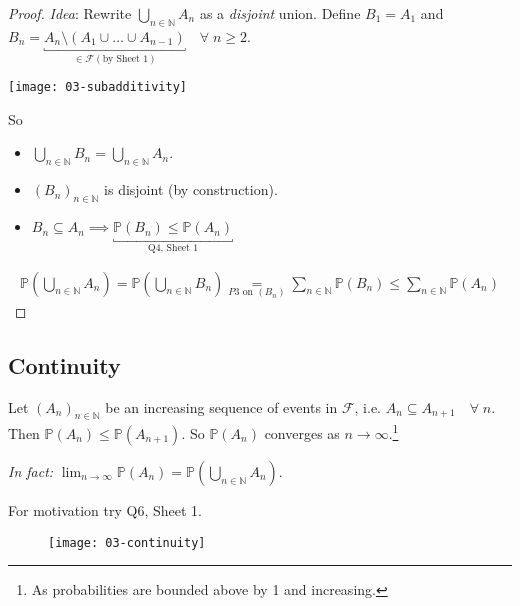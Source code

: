 \begin{proof}
    \emph{Idea}: Rewrite $\bigcup_{n \in \mathbb{N}} A_n$ as a \emph{disjoint} union.
    Define $B_1 = A_1$ and $B_n = \underbracket{A_n \setminus (A_1\cup \dots \cup A_{n-1})}_{\in \mathcal{F} (\text{by Sheet 1})}\quad \forall \; n \geq 2$.
    {\par \centering \texttt{[image: 03-subadditivity]} \par}
    So
    \begin{itemize}
        \item $\bigcup_{n \in \mathbb{N}} B_n = \bigcup_{n \in \mathbb{N}} A_n$.
        \item $(B_n)_{n \in \mathbb{N}}$ is disjoint (by construction).
        \item $B_n \subseteq A_n \implies \underbracket{\mathbb{P}(B_n) \leq \mathbb{P}(A_n)}_ {\text{Q4, Sheet 1}}$
    \end{itemize} 
    \begin{align*}
        \mathbb{P}\left(\bigcup_{n \in \mathbb{N}} A_n\right) = \mathbb{P}\left(\bigcup_{n \in \mathbb{N}} B_n\right) \underset{P3 \text{ on } (B_n)}{=} \sum_{n \in \mathbb{N}}  \mathbb{P}\left(B_n\right) \leq \sum_{n \in \mathbb{N}} \mathbb{P}\left(A_n\right)
    \end{align*} 
\end{proof} 

\subsection{Continuity}

\begin{proposition}[Continuity]
    Let $(A_n)_{n \in \mathbb{N}}$ be an increasing sequence of events in $\mathcal{F}$, i.e. $A_n \subseteq A_{n + 1} \quad \forall \; n$. 
    Then $\mathbb{P}(A_n) \leq \mathbb{P}(A_{n + 1})$.
    So $\mathbb{P}(A_n)$ converges as $n \to \infty$.\footnote{As probabilities are bounded above by 1 and increasing.}

    \emph{In fact:} $\lim_{n \to \infty} \mathbb{P}(A_n) = \mathbb{P} \left(\bigcup_{n \in \mathbb{N}} A_n \right)$.
\end{proposition} 

For motivation try Q6, Sheet 1.

\begin{figure}[h] 
    \centering 
    \texttt{[image: 03-continuity]} 
\end{figure}

